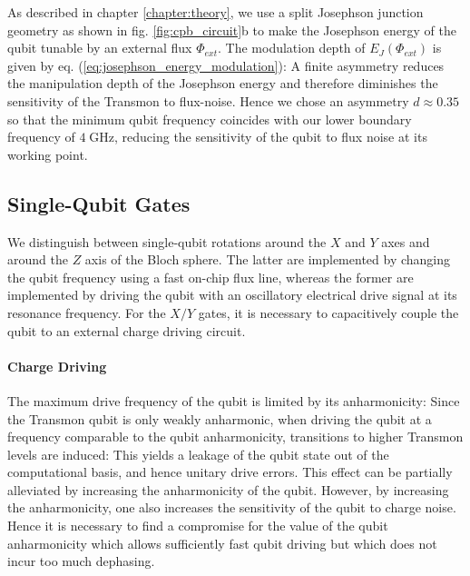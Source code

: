 \smallskip

As described in chapter \ref{chapter:theory}, we use a split Josephson junction geometry as shown in fig. \ref{fig:cpb_circuit}b to make the Josephson energy of the qubit tunable by an external flux $\Phi_{ext}$. The modulation depth of $E_J(\Phi_{ext})$ is given by eq. (\ref{eq:josephson_energy_modulation}): A finite asymmetry reduces the manipulation depth of the Josephson energy and therefore diminishes the sensitivity of the Transmon to flux-noise. Hence we chose an asymmetry $d\approx 0.35$ so that the minimum qubit frequency coincides with our lower boundary frequency of $4\;\mathrm{GHz}$, reducing the sensitivity of the qubit to flux noise at its working point.

\subsection{Single-Qubit Gates} \label{section:qubit_driving}

We distinguish between single-qubit rotations around the $X$ and $Y$ axes and around the $Z$ axis of the Bloch sphere. The latter are implemented by changing the qubit frequency using a fast on-chip flux line, whereas the former are implemented by driving the qubit with an oscillatory electrical drive signal at its resonance frequency. For the $X/Y$ gates, it is necessary to capacitively couple the qubit to an external charge driving circuit. 

\paragraph{Charge Driving} \label{section:charge_driving}

The maximum drive frequency of the qubit is limited by its anharmonicity: Since the Transmon qubit is only weakly anharmonic, when driving the qubit at a frequency comparable to the qubit anharmonicity, transitions to higher Transmon levels are induced: This yields a leakage of the qubit state out of the computational basis, and hence unitary drive errors. This effect can be partially alleviated by increasing the anharmonicity of the qubit. However, by increasing the anharmonicity, one also increases the sensitivity of the qubit to charge noise. Hence it is necessary to find a compromise for the value of the qubit anharmonicity which allows sufficiently fast qubit driving but which does not incur too much dephasing.

\smallskip

